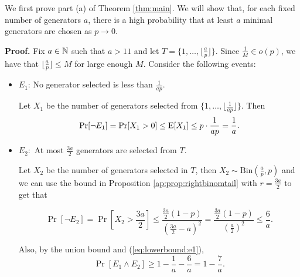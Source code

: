 We first prove part (a) of Theorem \ref{thm:main}. We will show that, for each fixed number of generators $a$, there is a high probability that at least $a$ minimal generators are chosen as $p \to 0$.

\textbf{Proof. }
Fix $a \in \mathbb{N}$ such that $a > 11$ and let $T = \{1, \ldots, \lfloor\frac{a}{p}\rfloor\}$. Since   $\frac{1}{M} \in o(p)$, we have that $\lfloor\frac{a}{p}\rfloor \leq M$ for large enough $M$. Consider the following events:
\begin{itemize}
    \item $E_1$: No generator selected is less than $\frac{1}{ap}$.  \par
    Let $X_1$ be the number of generators selected from $\{1,\ldots,\lfloor\frac{1}{ap}\rfloor\}$. Then 
    \begin{equation}\label{eq:lowerbound:e1}
    \mathrm{Pr}[\lnot E_1] = \mathrm{Pr}[X_1 > 0] \leq \mathrm{E}[X_1] \leq p \cdot \frac{1}{ap} = \frac{1}{a}.
    \end{equation}

    \item $E_2:$ At most $\frac{3a}{2}$ generators are selected from $T$.\par 
    Let $X_2$ be the number of generators selected in $T$, then $X_2 \sim \mathrm{Bin}(\frac{a}{p}, p)$ and we can use the bound in Proposition \ref{ap:prop:rightbinomtail} with $r = \frac{3a}{2}$ to get that

    \[\Pr[\lnot E_2] = \Pr\left[X_2 > \frac{3a}{2}\right] \leq  \frac{\frac{3a}{2}(1 - p)}{(\frac{3a}{2} - a)^2} = \frac{\frac{3a}{2}(1 - p)}{(\frac{a}{2})^2}\leq \frac{6}{a}.\]

    Also, by the union bound and (\ref{eq:lowerbound:e1}),
    \begin{equation}\label{eq:lowerbound:e1ande2}
     \Pr[E_1\land E_2] \geq 1 - \frac{1}{a} - \frac{6}{a} = 1 - \frac{7}{a}.
    \end{equation}


\end{itemize}

